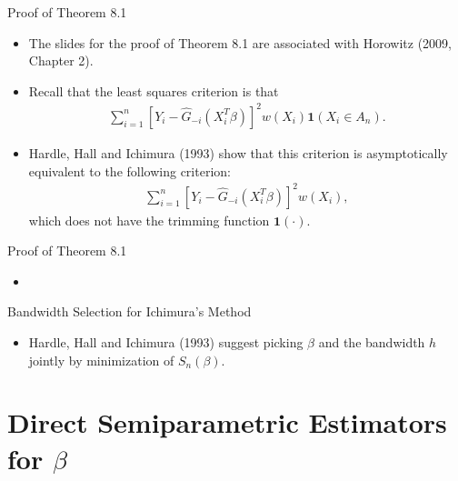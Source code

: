 \documentclass[xcolor=svgnames,dvipdfmx,cjk]{beamer}
\theoremstyle{example}
\begin{document}
  \begin{frame}{Proof of Theorem 8.1}
    \begin{itemize}
      \item The slides for the proof of Theorem 8.1 
            are associated with Horowitz (2009, Chapter 2).
      \item Recall that the least squares criterion is that
            \begin{align*}
              \sum_{i=1}^{n}  
              \left[ Y_i - \hat{G}_{-i}(X_i^{T}\beta) \right]^2 
              w(X_i) \mathbf{1}(X_i \in A_n).
            \end{align*}
      \item Hardle, Hall and Ichimura (1993) show that this criterion 
            is asymptotically equivalent to the following criterion:
            \begin{align*}
              \sum_{i=1}^{n}  
              \left[ Y_i - \hat{G}_{-i}(X_i^{T}\beta) \right]^2 
              w(X_i),
            \end{align*}
            which does not have the trimming function $\mathbf{1}(\cdot)$.
    \end{itemize}
  \end{frame}
  
  \begin{frame}{Proof of Theorem 8.1}
    \begin{itemize}
      \item 
  
  
    \end{itemize}
  \end{frame}
  
  
  \begin{frame}{Bandwidth Selection for Ichimura's Method}
    \begin{itemize}
      \item Hardle, Hall and Ichimura (1993) suggest 
            picking $\beta$ and the bandwidth $h$ jointly
            by minimization of $S_n(\beta)$.
    \end{itemize}
  \end{frame}
  
  
  
  \section{Direct Semiparametric Estimators for $\beta$}
  
  
  
  
  
\end{document}
